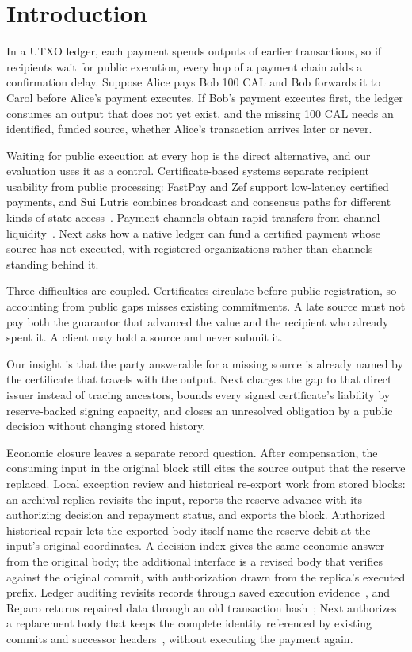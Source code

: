 \section{Introduction}
\label{sec:introduction}

In a UTXO ledger, each payment spends outputs of earlier transactions, so if recipients wait for public execution, every hop of a payment chain adds a confirmation delay. Suppose Alice pays Bob 100 CAL and Bob forwards it to Carol before Alice's payment executes. If Bob's payment executes first, the ledger consumes an output that does not yet exist, and the missing 100 CAL needs an identified, funded source, whether Alice's transaction arrives later or never.

Waiting for public execution at every hop is the direct alternative, and our evaluation uses it as a control. Certificate-based systems separate recipient usability from public processing: FastPay and Zef support low-latency certified payments, and Sui Lutris combines broadcast and consensus paths for different kinds of state access~\cite{fastpay,zef,lutris}. Payment channels obtain rapid transfers from channel liquidity~\cite{blitz,donner}. Next asks how a native ledger can fund a certified payment whose source has not executed, with registered organizations rather than channels standing behind it.

Three difficulties are coupled. Certificates circulate before public registration, so accounting from public gaps misses existing commitments. A late source must not pay both the guarantor that advanced the value and the recipient who already spent it. A client may hold a source and never submit it.

Our insight is that the party answerable for a missing source is already named by the certificate that travels with the output. Next charges the gap to that direct issuer instead of tracing ancestors, bounds every signed certificate's liability by reserve-backed signing capacity, and closes an unresolved obligation by a public decision without changing stored history.

Economic closure leaves a separate record question. After compensation, the
consuming input in the original block still cites the source output that
the reserve replaced. Local exception review and historical re-export work
from stored blocks: an archival replica revisits the input, reports the
reserve advance with its authorizing decision and repayment status, and
exports the block. Authorized historical repair lets the exported body
itself name the reserve debit at the input's original coordinates. A
decision index gives the same economic answer from the original body; the
additional interface is a revised body that verifies against the original
commit, with authorization drawn from the replica's executed prefix. Ledger
auditing revisits records through saved execution evidence~\cite{ia-ccf},
and Reparo returns repaired data through an old transaction
hash~\cite{reparo}; Next authorizes a replacement body that keeps the
complete identity referenced by existing commits and successor
headers~\cite{comet-blockid}, without executing the payment again.

